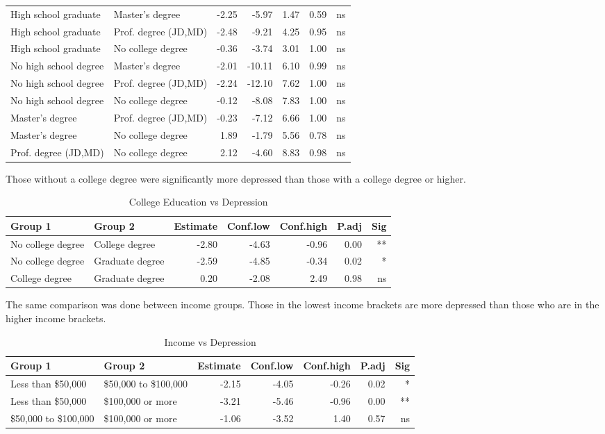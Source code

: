 \documentclass{article}
\begin{document}
\begin{table}[ht]
\begin{tabular}{llrrrrr}
 High school graduate & Master's degree  & -2.25 & -5.97 & 1.47 & 0.59 & ns \\ 
 High school graduate & Prof. degree (JD,MD)  & -2.48 & -9.21 & 4.25 & 0.95 & ns \\ 
 High school graduate & No college degree  & -0.36 & -3.74 & 3.01 & 1.00 & ns \\ 
 No high school degree & Master's degree  & -2.01 & -10.11 & 6.10 & 0.99 & ns \\ 
 No high school degree & Prof. degree (JD,MD)  & -2.24 & -12.10 & 7.62 & 1.00 & ns \\ 
 No high school degree & No college degree  & -0.12 & -8.08 & 7.83 & 1.00 & ns \\ 
 Master's degree & Prof. degree (JD,MD)  & -0.23 & -7.12 & 6.66 & 1.00 & ns \\ 
 Master's degree & No college degree  & 1.89 & -1.79 & 5.56 & 0.78 & ns \\ 
 Prof. degree (JD,MD) & No college degree  & 2.12 & -4.60 & 8.83 & 0.98 & ns \\ 
   \hline
\end{tabular}
\end{table}

\pagebreak
\noindent
Those without a college degree were significantly more depressed than those with a college degree or higher.

\begin{table}[ht]
\centering
\caption{College Education vs Depression} \label{tab:title}
\begin{tabular}{llrrrrr}
  \hline
Group 1 & Group 2 & Estimate & Conf.low & Conf.high & P.adj & Sig \\ 
  \hline
No college degree & College degree & -2.80 & -4.63 & -0.96 & 0.00 & ** \\ 
No college degree & Graduate degree & -2.59 & -4.85 & -0.34 & 0.02 & * \\ 
College degree & Graduate degree & 0.20 & -2.08 & 2.49 & 0.98 & ns \\ 
   \hline
\end{tabular}
\end{table}

\bigskip
\bigskip
\noindent
The same comparison was done between income groups. Those in the lowest income brackets are more depressed than those who are in the higher income brackets.

\begin{table}[ht]
\centering
\caption{Income vs Depression} \label{tab:title}
\begin{tabular}{llrrrrr}
  \hline
Group 1 & Group 2 & Estimate & Conf.low & Conf.high & P.adj & Sig \\ 
  \hline
Less than \$50,000 & \$50,000 to \$100,000 & -2.15 & -4.05 & -0.26 & 0.02 & * \\ 
Less than \$50,000 & \$100,000 or more & -3.21 & -5.46 & -0.96 & 0.00 & ** \\ 
\$50,000 to \$100,000 & \$100,000 or more & -1.06 & -3.52 & 1.40 & 0.57 & ns \\ 
   \hline
\end{tabular}
\end{table}
\end{document}
